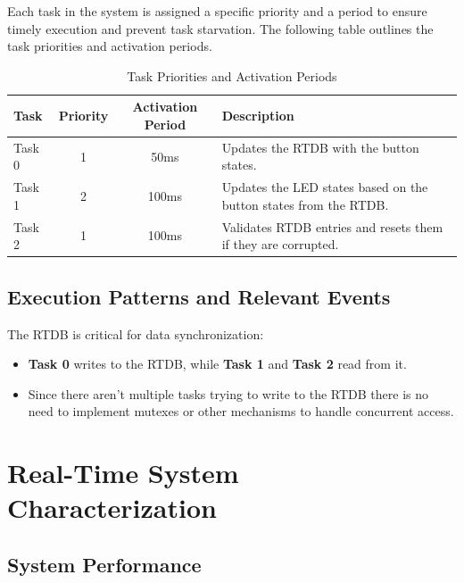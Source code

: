 \documentclass[a4paper,12pt]{article}
\begin{document}
Each task in the system is assigned a specific priority and a period to ensure timely execution and prevent task starvation. The following table outlines the task priorities and activation periods.

\begin{table}[H]
    \centering
    \begin{tabular}{|l|c|c|p{5cm}|}
        \hline
        \textbf{Task} & \textbf{Priority} & \textbf{Activation Period} & \textbf{Description} \\
        \hline
        Task 0 & 1 & 50ms & Updates the RTDB with the button states. \\
        \hline
        Task 1 & 2 & 100ms & Updates the LED states based on the button states from the RTDB. \\
        \hline
        Task 2 & 1 & 100ms & Validates RTDB entries and resets them if they are corrupted. \\
        \hline
    \end{tabular}
    \caption{Task Priorities and Activation Periods}
    \label{tab:task_priorities}
\end{table}

\subsection{Execution Patterns and Relevant Events}
The RTDB is critical for data synchronization:
\begin{itemize}
    \item \textbf{Task 0} writes to the RTDB, while \textbf{Task 1} and \textbf{Task 2} read from it.
    \item Since there aren't multiple tasks trying to write to the RTDB there is no need to implement mutexes  or other mechanisms to handle concurrent access.
\end{itemize}

\section{Real-Time System Characterization}
\subsection{System Performance}
\end{document}
